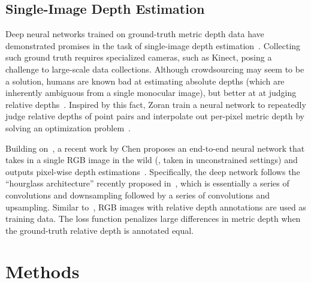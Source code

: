 \documentclass[10pt,twocolumn,letterpaper]{article}
\begin{document}
\subsection{Single-Image Depth Estimation}

Deep neural networks trained on ground-truth metric depth data have demonstrated promises in the task of single-image depth estimation~\cite{liu2015deep,eigen2015predicting,li2015depth,wang2015towards}. Collecting such ground truth requires specialized cameras, such as Kinect, posing a challenge to large-scale data collections. Although crowdsourcing may seem to be a solution, humans are known bad at estimating absolute depths (which are inherently ambiguous from a single monocular image), but better at at judging relative depths~\cite{todd2003visual}. Inspired by this fact, Zoran \etal train a neural network to repeatedly judge relative depths of point pairs and interpolate out per-pixel metric depth by solving an optimization problem~\cite{zoran2015learning}.

Building on~\cite{zoran2015learning}, a recent work by Chen \etal proposes an end-to-end neural network that takes in a single RGB image in the wild (\ie, taken in unconstrained settings) and outputs pixel-wise depth estimations~\cite{chen2016single}. Specifically, the deep network follows the ``hourglass architecture'' recently proposed in~\cite{newell2016stacked}, which is essentially a series of convolutions and downsampling followed by a series of convolutions and upsampling. Similar to~\cite{zoran2015learning}, RGB images with relative depth annotations are used as training data. The loss function penalizes large differences in metric depth when the ground-truth relative depth is annotated equal.

\section{Methods}
\end{document}
